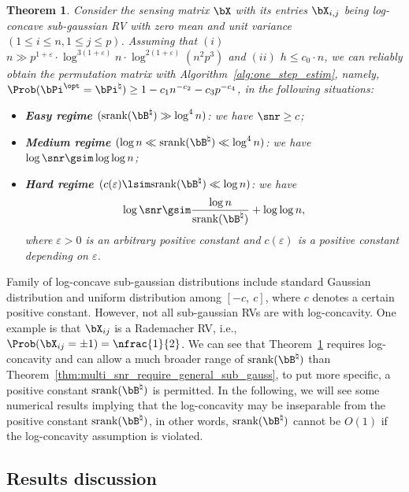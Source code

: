 \documentclass[11pt]{article}
\newtheorem{theorem}{Theorem}
\def \bPitrue {\bPi^{\natural}}
\def \bBtrue {\bB^{\natural}}
\def \bPiopt {\bPi^{\opt}}
\def\srank#1{\textup{srank}(#1)}
\begin{document}
\begin{theorem}
\label{thm:multi_snr_require_log_concave}
Consider the sensing matrix $\bX$ with its entries
$\bX_{i, j}$ being log-concave sub-gaussian RV with zero mean and unit variance
$(1\leq i \leq n, 1\leq j \leq p)$.
Assuming that $(i)$ $n\gg p^{1 + \varepsilon}\cdot\log^{3(1 +\varepsilon)} n\cdot \log^{2(1+\varepsilon)}(n^2 p^3)$
and  $(ii)$ $h\leq c_0 \cdot n$,
we can reliably obtain the permutation matrix with Algorithm~\ref{alg:one_step_estim}, namely,
$\Prob(\bPiopt = \bPitrue) \geq 1 - c_1 n^{-c_2} -c_3p^{-c_4}$,
in the following situations:
\begin{itemize}
\item
\textbf{Easy regime $(\srank{\bBtrue} \gg \log^4 n)$}: we have $\snr \geq c$;

\item
\textbf{Medium regime $(\log n \ll \srank{\bBtrue} \ll \log^4 n)$}:
we have $\log \snr \gsim \log \log n$;

\item
\textbf{Hard regime $(c(\varepsilon)\lsim \srank{\bBtrue} \ll \log n)$}:
we have
\begin{align}
\label{eq:multi_snr_require_logconcave}	
\log \snr \gsim \frac{\log n}{\srank{\bBtrue}} + \log \log n,
\end{align}
where $\varepsilon > 0$ is an arbitrary positive constant and
$c(\varepsilon)$ is a positive constant depending on $\varepsilon$.
\end{itemize}
\end{theorem}
Family of log-concave sub-gaussian distributions include
standard Gaussian distribution and uniform distribution among $[-c,~c]$, where
$c$ denotes a certain positive constant.
However, not all sub-gaussian RVs are with log-concavity.
One example is that $\bX_{ij}$ is a Rademacher RV, i.e.,
$\Prob(\bX_{ij} = \pm 1) = \nfrac{1}{2}$.
We can see that
Theorem~\ref{thm:multi_snr_require_log_concave} requires log-concavity and
can allow a much broader range of
$\srank{\bBtrue}$ than Theorem~\ref{thm:multi_snr_require_general_sub_gauss}, to put more specific, a positive constant $\srank{\bBtrue}$ is permitted.
In the following,
we will see some numerical results
implying that the log-concavity may be inseparable
from the positive constant $\srank{\bBtrue}$,
in other words, $\srank{\bBtrue}$ cannot be
$O(1)$ if the log-concavity assumption is violated.


\subsection{Results discussion}
\end{document}

